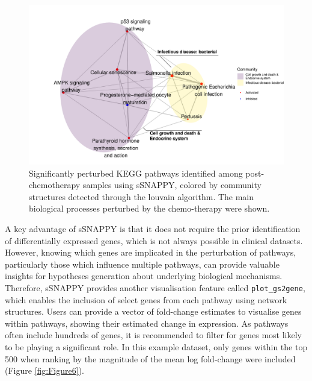 \documentclass[9pt,a4paper,]{extarticle}
\newenvironment{Shaded}{\begin{snugshade}}{\end{snugshade}}
\newcommand{\DecValTok}[1]{\textcolor[rgb]{0.00,0.00,0.81}{#1}}
\newcommand{\FunctionTok}[1]{\textcolor[rgb]{0.00,0.00,0.00}{#1}}
\newcommand{\NormalTok}[1]{#1}
\newcommand{\OtherTok}[1]{\textcolor[rgb]{0.56,0.35,0.01}{#1}}
\newcommand{\SpecialCharTok}[1]{\textcolor[rgb]{0.00,0.00,0.00}{#1}}
\newcommand{\StringTok}[1]{\textcolor[rgb]{0.31,0.60,0.02}{#1}}
\begin{document}
\begin{figure}

{\centering \includegraphics[width=0.8\linewidth]{sSNAPPY_paper_files/figure-latex/Figure5-1} 

}

\caption{Significantly perturbed KEGG pathways identified among post-chemotherapy samples using sSNAPPY, colored by community structures detected through the louvain algorithm. The main biological processes perturbed by the chemo-therapy were shown.}\label{fig:Figure5}
\end{figure}

A key advantage of sSNAPPY is that it does not require the prior identification of differentially expressed genes, which is not always possible in clinical datasets.
However, knowing which genes are implicated in the perturbation of pathways, particularly those which influence multiple pathways, can provide valuable insights for hypotheses generation about underlying biological mechanisms.
Therefore, sSNAPPY provides another visualisation feature called \texttt{plot\_gs2gene}, which enables the inclusion of select genes from each pathway using network structures.
Users can provide a vector of fold-change estimates to visualise genes within pathways, showing their estimated change in expression.
As pathways often include hundreds of genes, it is recommended to filter for genes most likely to be playing a significant role.
In this example dataset, only genes within the top 500 when ranking by the magnitude of the mean log fold-change were included (Figure \ref{fig:Figure6}).

\begin{Shaded}
\end{Shaded}
\end{document}
